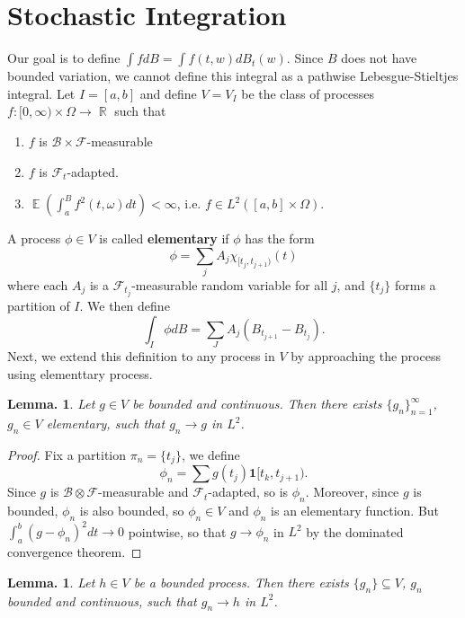 \documentclass[11pt, a4paper]{memoir}
\DeclareMathOperator{\R}{{\mathbb{R}}}
\theoremstyle{change}
\newtheorem{lemma}[theorem]{Lemma.}
\theoremstyle{plain}
\theoremstyle{nonumberplain}
\newtheorem{proof}{Proof}
\DeclareMathOperator{\E}{{\mathbb{E}}}
\newcommand{\defn}[1]{{\boldmath\bfseries #1}}
\newcommand{\idc}{\mathbf{1}}
\numberwithin{equation}{section}
\begin{document}
\section{Stochastic Integration}
Our goal is to define $\int fdB=\int f(t,w)dB_t(w)$.
Since $B$ does not have bounded variation, we cannot define this integral as a pathwise Lebesgue-Stieltjes integral.
Let $I=[a,b]$ and define $V=V_I$ be the class of processes $f:[0,\infty)\times\Omega\to\R$ such that
\begin{enumerate}[nl,r]
    \item $f$ is $\mathcal{B}\times\mathcal{F}$-measurable
    \item $f$ is $\mathcal{F}_t$-adapted.
    \item $\E(\int_a^Bf^2(t,\omega)dt)<\infty$, i.e. $f\in L^2([a,b]\times\Omega)$.
\end{enumerate}
A process $\phi\in V$ is called \defn{elementary} if $\phi$ has the form
\begin{equation*}
    \phi=\sum_j A_j\chi_{[t_j,t_{j+1})}(t)
\end{equation*}
where each $A_j$ is a $\mathcal{F}_{t_j}$-measurable random variable for all $j$, and $\{t_j\}$ forms a partition of $I$.
We then define
\begin{equation*}
    \int_I\phi dB=\sum_J A_j(B_{t_{j+1}}-B_{t_j}).
\end{equation*}
Next, we extend this definition to any process in $V$ by approaching the process using elementtary process.
\begin{lemma}
    Let $g\in V$ be bounded and continuous.
    Then there exists $\{g_n\}_{n=1}^\infty$, $g_n\in V$ elementary, such that $g_n\to g$ in $L^2$.
\end{lemma}
\begin{proof}
    Fix a partition $\pi_n=\{t_j\}$, we define
    \begin{equation*}
        \phi_n=\sum g(t_j)\idc{[t_k,t_{j+1})}.
    \end{equation*}
    Since $g$ is $\mathcal{B}\otimes\mathcal{F}$-measurable and $\mathcal{F}_t$-adapted, so is $\phi_n$.
    Moreover, since $g$ is bounded, $\phi_n$ is also bounded, so $\phi_n\in V$ and $\phi_n$ is an elementary function.
    But $\int_a^b(g-\phi_n)^2dt\to 0$ pointwise, so that $g\to\phi_n$ in $L^2$ by the dominated convergence theorem.
\end{proof}
\begin{lemma}
    Let $h\in V$ be a bounded process.
    Then there exists $\{g_n\}\subseteq V$, $g_n$ bounded and continuous, such that $g_n\to h$ in $L^2$.
\end{lemma}
\end{document}
